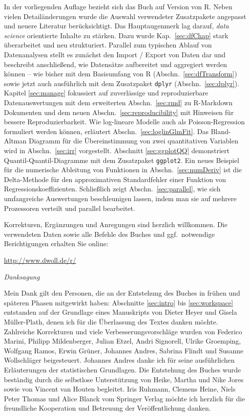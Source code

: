 In der vorliegenden Auflage bezieht sich das Buch auf Version  von R. Neben vielen Detailänderungen wurde die Auswahl verwendeter Zusatzpakete angepasst und neuere Literatur berücksichtigt. Das Hauptaugenmerk lag darauf, \emph{data science} orientierte Inhalte zu stärken. Dazu wurde Kap.\ \ref{sec:dfChap} stark überarbeitet und neu strukturiert. Parallel zum typischen Ablauf von Datenanalysen stellt es zunächst den Import / Export von Daten dar und beschreibt anschließend, wie Datensätze aufbereitet und aggregiert werden können -- wie bisher mit dem Basisumfang von R (Abschn.\ \ref{sec:dfTransform}) sowie jetzt auch ausführlich mit dem Zusatzpaket \lstinline!dplyr! (Abschn.\ \ref{sec:dplyr}). Kapitel \ref{sec:manage} fokussiert auf zuverlässige und reproduzierbare Datenauswertungen mit dem erweiterten Abschn.\ \ref{sec:rmd} zu R-Markdown Dokumenten und dem neuen Abschn.\ \ref{sec:reproducibility} mit Hinweisen für bessere Reproduzierbarkeit. Wie log-lineare Modelle auch als Poisson-Regression formuliert werden können, erläutert Abschn.\ \ref{sec:loglinGlmFit}. Das Bland-Altman Diagramm für die Übereinstimmung von zwei quantitativen Variablen wird in Abschn.\ \ref{sec:irr} vorgestellt. Abschnitt \ref{sec:ggplotQQ} demonstriert Quantil-Quantil-Diagramme mit dem Zusatzpaket \lstinline!ggplot2!. Ein neues Beispiel für die numerische Ableitung von Funktionen in Abschn.\ \ref{sec:numDeriv} ist die Delta-Methode für den approximativen Standardfehler einer Funktion von Regressionskoeffizienten. Schließlich zeigt Abschn.\ \ref{sec:parallel}, wie sich umfangreiche Auswertungen beschleunigen lassen, indem man sie auf mehrere Prozessoren verteilt und parallel bearbeitet.

Korrekturen, Ergänzungen und Anregungen sind herzlich willkommen. Die verwendeten Daten sowie alle Befehle des Buches und ggf.\ notwendige Berichtigungen erhalten Sie online:

\url{http://www.dwoll.de/r/}

\textit{Danksagung}

Mein Dank gilt den Personen, die an der Entstehung des Buches in frühen und späteren Phasen mitgewirkt haben: Abschnitte \ref{sec:intro} bis \ref{sec:workspace} entstanden auf der Grundlage eines Manuskripts von Dieter Heyer und Gisela Müller-Plath, denen ich für die Überlassung des Textes danken möchte. Zahlreiche Korrekturen und viele Verbesserungsvorschläge wurden von Federico Marini, Philipp Mildenberger, Julian Etzel, Andri Signorell, Ulrike Groemping, Wolfgang Ramos, Erwin Grüner, Johannes Andres, Sabrina Flindt und Susanne Wollschläger beigesteuert. Johannes Andres danke ich für seine ausführlichen Erläuterungen der statistischen Grundlagen. Die Entstehung des Buches wurde beständig durch die selbstlose Unterstützung von Heike, Martha und Nike Jores sowie von Vincent van Houten begleitet. Iris Ruhmann, Clemens Heine, Niels Peter Thomas und Alice Blanck vom Springer Verlag möchte ich herzlich für die freundliche Kooperation und Betreuung der Veröffentlichung danken.

